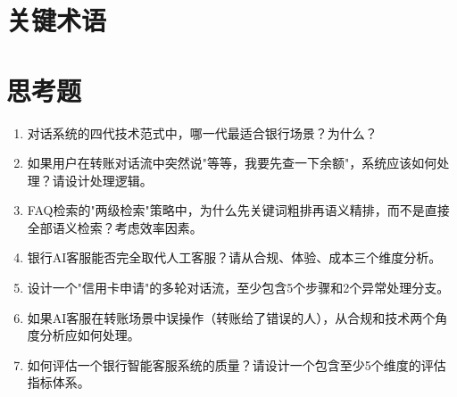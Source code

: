 \section{关键术语}


\section{思考题}

\begin{exercisebox}[本章思考题]
\begin{enumerate}[leftmargin=2em]
  \item 对话系统的四代技术范式中，哪一代最适合银行场景？为什么？
  \item 如果用户在转账对话流中突然说"等等，我要先查一下余额"，系统应该如何处理？请设计处理逻辑。
  \item FAQ检索的"两级检索"策略中，为什么先关键词粗排再语义精排，而不是直接全部语义检索？考虑效率因素。
  \item 银行AI客服能否完全取代人工客服？请从合规、体验、成本三个维度分析。
  \item 设计一个"信用卡申请"的多轮对话流，至少包含5个步骤和2个异常处理分支。
  \item 如果AI客服在转账场景中误操作（转账给了错误的人），从合规和技术两个角度分析应如何处理。
  \item 如何评估一个银行智能客服系统的质量？请设计一个包含至少5个维度的评估指标体系。
\end{enumerate}
\end{exercisebox}

